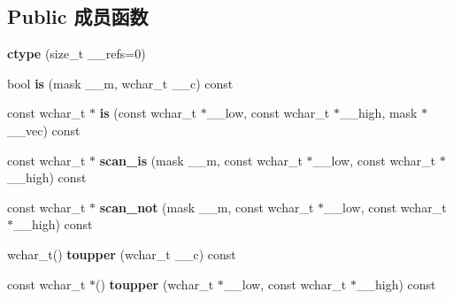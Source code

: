 \subsection*{Public 成员函数}
\begin{DoxyCompactItemize}
\item 
\mbox{\label{classctype_3_01wchar__t_01_4_a6f55b5a096db61bab9be41864e9b41bd}} 
{\bfseries ctype} (size\+\_\+t \+\_\+\+\_\+refs=0)
\item 
\mbox{\label{classctype_3_01wchar__t_01_4_ab74d962c95b33f9b298b9f9d6e33c6c3}} 
bool {\bfseries is} (mask \+\_\+\+\_\+m, wchar\+\_\+t \+\_\+\+\_\+c) const
\item 
\mbox{\label{classctype_3_01wchar__t_01_4_ab5f4545a2710bf875b0ce4375de05955}} 
const wchar\+\_\+t $\ast$ {\bfseries is} (const wchar\+\_\+t $\ast$\+\_\+\+\_\+low, const wchar\+\_\+t $\ast$\+\_\+\+\_\+high, mask $\ast$\+\_\+\+\_\+vec) const
\item 
\mbox{\label{classctype_3_01wchar__t_01_4_acd08a8bd97995802d02110086c7bef81}} 
const wchar\+\_\+t $\ast$ {\bfseries scan\+\_\+is} (mask \+\_\+\+\_\+m, const wchar\+\_\+t $\ast$\+\_\+\+\_\+low, const wchar\+\_\+t $\ast$\+\_\+\+\_\+high) const
\item 
\mbox{\label{classctype_3_01wchar__t_01_4_aac8231a16ccb85da8152867526506130}} 
const wchar\+\_\+t $\ast$ {\bfseries scan\+\_\+not} (mask \+\_\+\+\_\+m, const wchar\+\_\+t $\ast$\+\_\+\+\_\+low, const wchar\+\_\+t $\ast$\+\_\+\+\_\+high) const
\item 
\mbox{\label{classctype_3_01wchar__t_01_4_a1f7608d79cbbef86e4def8a8e25ffac2}} 
wchar\+\_\+t() {\bfseries toupper} (wchar\+\_\+t \+\_\+\+\_\+c) const
\item 
\mbox{\label{classctype_3_01wchar__t_01_4_a1dbac2ceeabec471314ad4a994e7ba6b}} 
const wchar\+\_\+t $\ast$() {\bfseries toupper} (wchar\+\_\+t $\ast$\+\_\+\+\_\+low, const wchar\+\_\+t $\ast$\+\_\+\+\_\+high) const
\item 
\mbox{\label{classctype_3_01wchar__t_01_4_a0318a6ec8c610110ecdbede70da3f616}} 

\end{DoxyCompactItemize}
